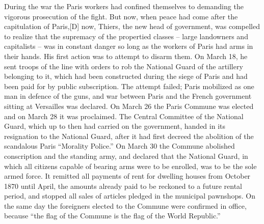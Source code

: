 \documentclass{book}
\begin{document}
During the war the Paris workers had confined themselves to demanding the
vigorous prosecution of the fight. But now, when peace had come after the
capitulation of Paris,[D] now, Thiers, the new head of government, was
compelled to realize that the supremacy of the propertied classes – large
landowners and capitalists – was in constant danger so long as the workers
of Paris had arms in their hands. His first action was to attempt to
disarm them. On March 18, he sent troops of the line with orders to rob
the National Guard of the artillery belonging to it, which had been
constructed during the siege of Paris and had been paid for by public
subscription. The attempt failed; Paris mobilized as one man in defence of
the guns, and war between Paris and the French government sitting at
Versailles was declared. On March 26 the Paris Commune was elected and on
March 28 it was proclaimed. The Central Committee of the National Guard,
which up to then had carried on the government, handed in its resignation
to the National Guard, after it had first decreed the abolition of the
scandalous Paris “Morality Police.” On March 30 the Commune abolished
conscription and the standing army, and declared that the National Guard,
in which all citizens capable of bearing arms were to be enrolled, was to
be the sole armed force. It remitted all payments of rent for dwelling
houses from October 1870 until April, the amounts already paid to be
reckoned to a future rental period, and stopped all sales of articles
pledged in the municipal pawnshops. On the same day the foreigners elected
to the Commune were confirmed in office, because “the flag of the Commune
is the flag of the World Republic.”
\end{document}

